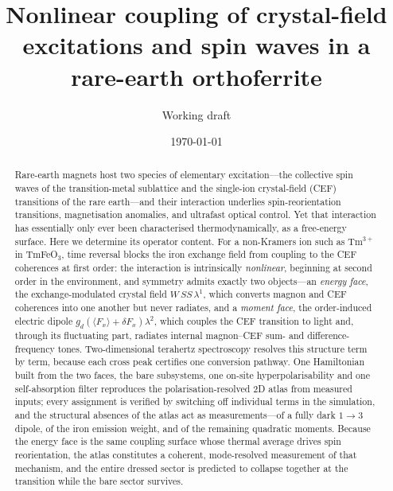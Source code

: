 \documentclass[aps,prb,twocolumn,superscriptaddress,longbibliography]{revtex4-2}
\begin{document}
\title{Nonlinear coupling of crystal-field excitations and spin waves
in a rare-earth orthoferrite}

\author{Working draft}
\affiliation{---}

\date{\today}

\begin{abstract}
Rare-earth magnets host two species of elementary excitation---the
collective spin waves of the transition-metal sublattice and the
single-ion crystal-field (CEF) transitions of the rare earth---and
their interaction underlies spin-reorientation transitions,
magnetisation anomalies, and ultrafast optical control.  Yet that
interaction has essentially only ever been characterised
thermodynamically, as a free-energy surface.  Here we determine its
operator content.  For a non-Kramers ion such as Tm$^{3+}$ in
TmFeO$_3$, time reversal blocks the iron exchange field from coupling
to the CEF coherences at first order: the interaction is
intrinsically \emph{nonlinear}, beginning at second order in the
environment, and symmetry admits exactly two objects---an
\emph{energy face}, the exchange-modulated crystal field
$W\,SS\,\lambda^1$, which converts magnon and CEF coherences into one
another but never radiates, and a \emph{moment face}, the
order-induced electric dipole
$g_d(\langle F_x\rangle{+}\delta F_x)\lambda^2$, which couples the
CEF transition to light and, through its fluctuating part, radiates
internal magnon--CEF sum- and difference-frequency tones.
Two-dimensional terahertz spectroscopy resolves this structure term
by term, because each cross peak certifies one conversion pathway.
One Hamiltonian built from the two faces, the bare subsystems, one
on-site hyperpolarisability and one self-absorption filter reproduces
the polarisation-resolved 2D atlas from measured inputs; every
assignment is verified by switching off individual terms in the
simulation, and the structural absences of the atlas act as
measurements---of a fully dark $1\!\to\!3$ dipole, of the iron
emission weight, and of the remaining quadratic moments.  Because the
energy face is the same coupling surface whose thermal average drives
spin reorientation, the atlas constitutes a coherent, mode-resolved
measurement of that mechanism, and the entire dressed sector is
predicted to collapse together at the transition while the bare
sector survives.
\end{abstract}

\maketitle
\end{document}
